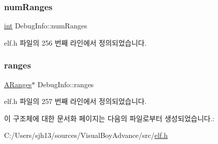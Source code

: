 \subsubsection{\texorpdfstring{num\+Ranges}{numRanges}}
{\footnotesize\ttfamily \mbox{\hyperlink{_util_8cpp_a0ef32aa8672df19503a49fab2d0c8071}{int}} Debug\+Info\+::num\+Ranges}



elf.\+h 파일의 256 번째 라인에서 정의되었습니다.

\mbox{\label{struct_debug_info_ad048748b52971c0564054f85a1ed6093}} 
\subsubsection{\texorpdfstring{ranges}{ranges}}
{\footnotesize\ttfamily \mbox{\hyperlink{struct_a_ranges}{A\+Ranges}}$\ast$ Debug\+Info\+::ranges}



elf.\+h 파일의 257 번째 라인에서 정의되었습니다.



이 구조체에 대한 문서화 페이지는 다음의 파일로부터 생성되었습니다.\+:\begin{DoxyCompactItemize}
\item 
C\+:/\+Users/sjh13/sources/\+Visual\+Boy\+Advance/src/\mbox{\hyperlink{elf_8h}{elf.\+h}}\end{DoxyCompactItemize}
